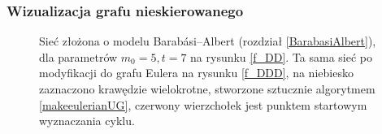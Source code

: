 \documentclass[a4paper, 12pt, twoside, openright]{article}
\begin{document}
\subsubsection{Wizualizacja grafu nieskierowanego}
	\begin{figure}[!htb]
			\centering
				\quad
		
		\caption[]{Sieć złożona o modelu Barabási–Albert (rozdział \ref{BarabasiAlbert}), dla parametrów $m_0=5, t=7$ na rysunku \ref{f_DD}. Ta sama sieć po modyfikacji do grafu Eulera na rysunku \ref{f_DDD}, na niebiesko zaznaczono krawędzie wielokrotne, stworzone sztucznie algorytmem \ref{makeeulerianUG}, czerwony wierzchołek jest punktem startowym wyznaczania cyklu.}
		\label{f_graph}
	\end{figure}	
	\captionsetup{justification=centering}
	
\end{document}
